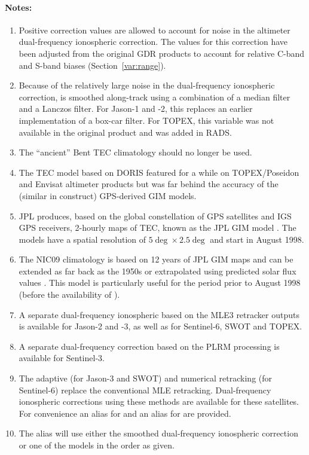 \documentclass[a4paper,11pt,openany,natbib,nomargin]{thesis}
\newenvironment{notes}[1][Notes:]{\FloatBarrier\paragraph{#1}\begin{enumerate}}{\end{enumerate}}
\begin{document}
\begin{notes}
\item Positive correction values are allowed to account for noise in the altimeter dual-frequency ionospheric correction. The values for this correction have been adjusted from the original GDR products to account for relative C-band and S-band biases (Section~\ref{var:range}).\label{item:iono_alt}
\item Because of the relatively large noise in the dual-frequency ionospheric correction,  is smoothed along-track using a combination of a median filter and a Lanczos filter. For Jason-1 and -2, this replaces an earlier implementation of a box-car filter. For TOPEX, this variable was not available in the original product and was added in RADS.\label{item:iono_alt_smooth}
\item The ``ancient'' Bent TEC climatology \citep{llewellyn1973} should no longer be used.\label{item:iono_bent}
\item The TEC model based on DORIS featured for a while on TOPEX/Poseidon and Envisat altimeter products but was far behind the accuracy of the (similar in construct) GPS-derived GIM models.\label{item:iono_doris}
\item JPL produces, based on the global constellation of GPS satellites and IGS GPS receivers, 2-hourly maps of TEC, known as the JPL GIM model \citep{komjathy2000}. The models have a spatial resolution of $5\deg\times2.5\deg$ and start in August 1998.\label{item:iono_gim}
\item The NIC09 climatology is based on 12 years of JPL GIM maps and can be extended as far back as the 1950s or extrapolated using predicted solar flux values \citep{scharroo2010a}. This model is particularly useful for the period prior to August 1998 (before the availability of ).\label{item:iono_nic09}
\item A separate dual-frequency ionospheric based on the MLE3 retracker outputs is available for Jason-2 and -3, as well as for Sentinel-6, SWOT and TOPEX.\label{item:iono_alt_mle3}\label{item:iono_alt_smooth_mle3}
\item A separate dual-frequency correction based on the PLRM processing is available for Sentinel-3.\label{item:iono_alt_plrm}\label{item:iono_alt_smooth_plrm}
\item The adaptive (for Jason-3 and SWOT) and numerical retracking (for Sentinel-6) replace the conventional MLE retracking. Dual-frequency ionospheric corrections using these methods are available for these satellites.
For convenience an alias  for  and an alias  for  are provided.\label{item:iono_alt_adaptive}\label{item:iono_alt_nr}\label{item:iono_alt_smooth_adaptive}\label{item:iono_alt_smooth_nr} 
\item The alias  will use either the smoothed dual-frequency ionospheric correction or one of the models in the order as given.\label{item:iono}
\end{notes}
\end{document}
